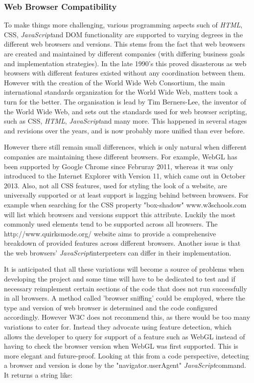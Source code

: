 \documentclass[a4paper,11pt,twoside]{article}
\begin{document}
\subsubsection{Web Browser Compatibility}

To make things more challenging, various programming aspects such of \textit{HTML}, CSS, \textit{JavaScript}and DOM functionality are supported to varying degrees in the different web browsers and versions. This stems from the fact that web browsers are created and maintained by different companies (with differing business goals and implementation strategies). In the late 1990's this proved disasterous as web browsers with different features existed without any coordination between them. However with the creation of the World Wide Web Consortium, the main international standards organization for the World Wide Web, matters took a turn for the better. The organisation is lead by Tim Berners-Lee, the inventor of the World Wide Web, and sets out the standards used for web browser scripting, such as CSS, \textit{HTML}, \textit{JavaScript}and many more. This happened in several stages and revisions over the years, and is now probably more unified than ever before. 

However there still remain small differences, which is only natural when different companies are maintaining these different browsers. For example, WebGL has been supported by Google Chrome since Februray 2011, whereas it was only introduced to the Internet Explorer with Version 11, which came out in October 2013. Also, not all CSS features, used for styling the look of a website, are universally supported or at least support is lagging behind between browsers. For example when searching for the CSS property "box-shadow" www.w3schools.com will list which browsers and versions support this attribute. Luckily the most commonly used elements tend to be supported across all browsers. The http://www.quirksmode.org/ website aims to provide a comprehensive breakdown of provided features across different browsers. Another issue is that the web browsers' \textit{JavaScript}interpreters can differ in their implementation.

It is anticipated that all these variations will become a source of problems when developing the project and some time will have to be dedicated to test and if necessary reimplement certain sections of the code that does not run successfully in all browsers. A method called 'browser sniffing' could be employed, where the type and version of web browser is determined and the code configured accordingly. However W3C does not recommend this, as there would be too many variations to cater for. Instead they advocate using feature detection, which allows the developer to query for support of a feature such as WebGL instead of having to check the browser version when WebGL was first supported. This is more elegant and future-proof. 
Looking at this from a code perspective, detecting a browser and version is done by the "navigator.userAgent" \textit{JavaScript}command. It returns a string like:
\end{document}
